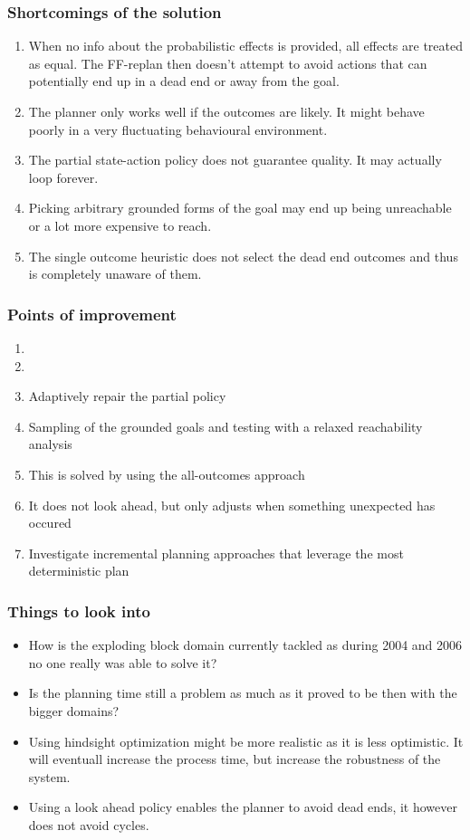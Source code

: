 \documentclass[runningheads,a4paper]{llncs}
\begin{document}
\subsubsection{Shortcomings of the solution}
\begin{enumerate}
	\item When no info about the probabilistic effects is provided, all effects are treated as equal. The FF-replan then doesn't attempt to avoid actions that can potentially end up in a dead end or away from the goal.
	\item  The planner only works well if the outcomes are likely. It might behave poorly in a very fluctuating behavioural environment.
	\item The partial state-action policy does not guarantee quality. It may actually loop forever.
	\item Picking arbitrary grounded forms of the goal may end up being unreachable or a lot more expensive to reach.
	\item The single outcome heuristic does not select the dead end outcomes and thus is completely unaware of them.
\end{enumerate}

\subsubsection{Points of improvement}
\begin{enumerate}
	\item
	\item
	\item Adaptively repair the partial policy
	\item Sampling of the grounded goals and testing with a relaxed reachability analysis
	\item This is solved by using the all-outcomes approach
	\item It does not look ahead, but only adjusts when something unexpected has occured

	\item Investigate incremental planning approaches that leverage the most deterministic plan
\end{enumerate}

\subsubsection{Things to look into}
\begin{itemize}
	\item How is the exploding block domain currently tackled as during 2004 and 2006 no one really was able to solve it?
	\item Is the planning time still a problem as much as it proved to be then with the bigger domains?
	\item Using hindsight optimization might be more realistic as it is less optimistic. It will eventuall increase the process time, but increase the robustness of the system.
	\item Using a look ahead policy enables the planner to avoid dead ends, it however does not avoid cycles.
\end{itemize}
\end{document}
